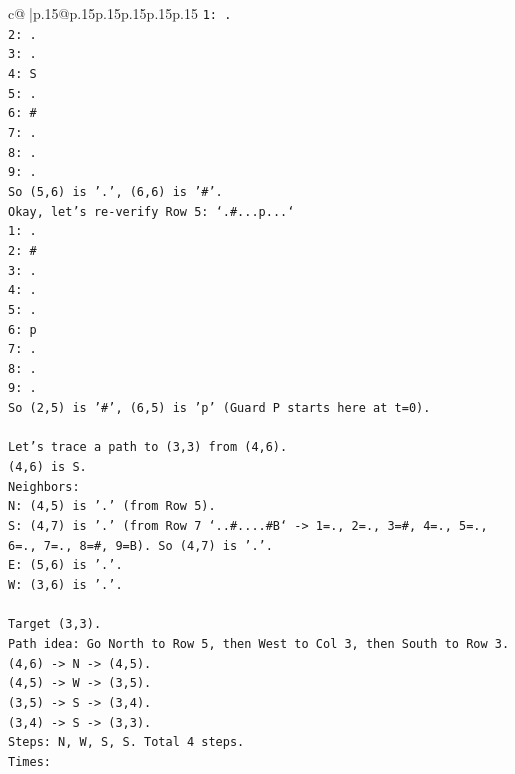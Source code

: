 \documentclass{article}
\begin{document}
{\begin{supertabular}{c@{$\;$}|p{.15\linewidth}@{}p{.15\linewidth}p{.15\linewidth}p{.15\linewidth}p{.15\linewidth}p{.15\linewidth}}
{{{\texttt{1: .} \\
\texttt{2: .} \\
\texttt{3: .} \\
\texttt{4: S} \\
\texttt{5: .} \\
\texttt{6: \#} \\
\texttt{7: .} \\
\texttt{8: .} \\
\texttt{9: .} \\
\texttt{So (5,6) is '.', (6,6) is '\#'.} \\
\texttt{Okay, let's re{-}verify Row 5: `.\#...p...`} \\
\texttt{1: .} \\
\texttt{2: \#} \\
\texttt{3: .} \\
\texttt{4: .} \\
\texttt{5: .} \\
\texttt{6: p} \\
\texttt{7: .} \\
\texttt{8: .} \\
\texttt{9: .} \\
\texttt{So (2,5) is '\#', (6,5) is 'p' (Guard P starts here at t=0).} \\
\\ 
\texttt{Let's trace a path to (3,3) from (4,6).} \\
\texttt{(4,6) is S.} \\
\texttt{Neighbors:} \\
\texttt{N: (4,5) is '.' (from Row 5).} \\
\texttt{S: (4,7) is '.' (from Row 7 `..\#....\#B` {-}> 1=., 2=., 3=\#, 4=., 5=., 6=., 7=., 8=\#, 9=B). So (4,7) is '.'.} \\
\texttt{E: (5,6) is '.'.} \\
\texttt{W: (3,6) is '.'.} \\
\\ 
\texttt{Target (3,3).} \\
\texttt{Path idea: Go North to Row 5, then West to Col 3, then South to Row 3.} \\
\texttt{(4,6) {-}> N {-}> (4,5).} \\
\texttt{(4,5) {-}> W {-}> (3,5).} \\
\texttt{(3,5) {-}> S {-}> (3,4).} \\
\texttt{(3,4) {-}> S {-}> (3,3).} \\
\texttt{Steps: N, W, S, S. Total 4 steps.} \\
\texttt{Times:} \\
}}}
\end{supertabular}}
\end{document}
